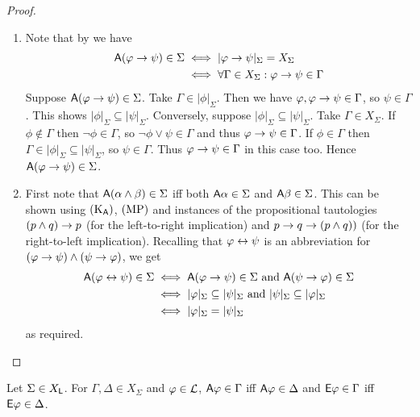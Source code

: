 \begin{proof}
\begin{enumerate}
    \item Note that by  we have
        \[
        \begin{aligned}
            \mathsf{A}(\varphi \to \psi) \in \Sigma
            &\iff |\varphi \to \psi|_\Sigma = X_\Sigma \\
            &\iff \forall \Gamma \in X_\Sigma: \varphi \to \psi \in
                \Gamma
        \end{aligned}
        \]
        Suppose $\mathsf{A}(\varphi \to \psi) \in \Sigma$. Take $\Gamma \in
        |\phi|_\Sigma$. Then we have $\varphi, \varphi \to \psi \in
        \Gamma$, so $\psi \in \Gamma$. This shows $|\phi|_\Sigma
        \subseteq |\psi|_\Sigma$.
        Conversely, suppose $|\phi|_\Sigma \subseteq |\psi|_\Sigma$.
        Take $\Gamma \in X_\Sigma$. If $\phi \notin \Gamma$ then
        $\neg\phi \in \Gamma$, so $\neg\phi \lor \psi \in \Gamma$ and
        thus $\varphi \to \psi \in \Gamma$. If $\phi \in \Gamma$
        then $\Gamma \in |\phi|_\Sigma \subseteq |\psi|_\Sigma$, so
        $\psi \in \Gamma$. Thus $\varphi \to \psi \in \Gamma$ in
        this case too. Hence $\mathsf{A}(\varphi \to \psi) \in \Sigma$.

   \item First note that $\mathsf{A}(\alpha \land \beta)
       \in \Sigma$ iff both $\mathsf{A}\alpha \in \Sigma$ and $\mathsf{A}\beta \in \Sigma$.
       This can be shown using $(\text{K}_{\mathsf{A}})$, $(\text{MP})$ and instances of the
       propositional tautologies $(p \land q) \to p$ (for the
       left-to-right implication) and $p \to q \to (p \land q))$
       (for the right-to-left implication).
        Recalling that $\varphi \leftrightarrow \psi$ is an abbreviation for $(\varphi
        \to \psi) \land (\psi \to \varphi)$, we get
        \[
        \begin{aligned}
            \mathsf{A}(\varphi \leftrightarrow \psi) \in \Sigma
            &\iff \mathsf{A}(\varphi \to \psi) \in \Sigma \text{ and }
                \mathsf{A}(\psi \to \varphi) \in \Sigma \\
            &\iff |\varphi|_\Sigma \subseteq |\psi|_\Sigma \text { and }
                |\psi|_\Sigma \subseteq |\varphi|_\Sigma \\
            & \iff |\varphi|_\Sigma = |\psi|_\Sigma
        \end{aligned}
        \]
        as required.
\end{enumerate}
\end{proof}

\begin{corollary}
\label{exp_cor_xsigma_agree_on_ae}
    Let $\Sigma \in X_{\mathsf{L}}$. For $\Gamma, \Delta \in X_\Sigma$ and $\varphi \in
    \mathcal{L}$, $\mathsf{A}\varphi \in \Gamma$ iff $\mathsf{A}\varphi \in \Delta$ and $\mathsf{E}\varphi \in \Gamma$
    iff $\mathsf{E}\varphi \in \Delta$.
\end{corollary}

